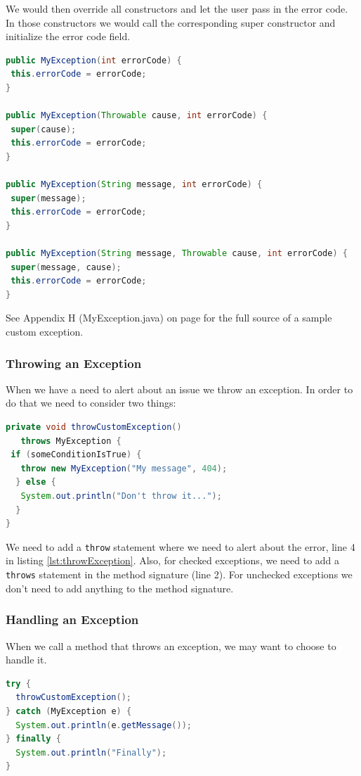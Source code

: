 We would then override all constructors and let the user pass in the error code. In those constructors we would call the corresponding super constructor and  initialize the error code field. 
\begin{lstlisting}[language=Java]
public MyException(int errorCode) {
 this.errorCode = errorCode;
}

public MyException(Throwable cause, int errorCode) {
 super(cause);
 this.errorCode = errorCode;
}

public MyException(String message, int errorCode) {
 super(message);
 this.errorCode = errorCode;
}

public MyException(String message, Throwable cause, int errorCode) {
 super(message, cause);
 this.errorCode = errorCode;
}
\end{lstlisting}


See Appendix H (MyException.java) on page \pageref{App:AppendixHExeption} for the full source of a sample custom exception.


\subsubsection{Throwing an Exception}
When we have a need to alert about an issue we throw an exception. In order to do that we need to consider two things:
\begin{lstlisting}[language=Java, label=lst:throwException]
private void throwCustomException() 
   throws MyException {
 if (someConditionIsTrue) {
   throw new MyException("My message", 404);
  } else {
   System.out.println("Don't throw it...");
  }
}
\end{lstlisting}

We need to add a \texttt{throw} statement where we need to alert about the error, line 4 in listing \ref{lst:throwException}. Also, for checked exceptions, we need to add a \texttt{throws} statement in the method signature (line 2). For unchecked exceptions we don't need to add anything to the method signature.

\subsubsection{Handling an Exception}
When we call a method that throws an exception, we may want to choose to handle it. 

\begin{lstlisting}[language=Java, label=lst:catch]
try {
  throwCustomException();
} catch (MyException e) {
  System.out.println(e.getMessage());
} finally {
  System.out.println("Finally");
}
\end{lstlisting}

